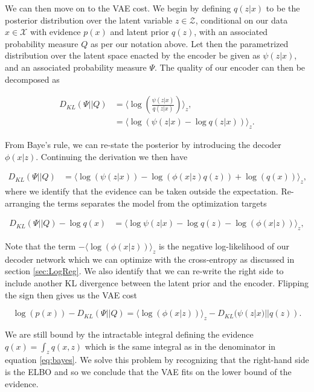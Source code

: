 We can then move on to the VAE cost. We begin by defining $q(z|x)$ to be the posterior distribution over the latent variable $z \in \mathcal{Z}$, conditional on our data $x \in \mathcal{X}$ with evidence $p(x)$ and latent prior $q(z)$, with an associated probability measure $Q$ as per our notation above. Let then the parametrized distribution over the latent space enacted by the encoder be given as $\psi(z|x)$, and an associated probability measure $\Psi$. The quality of our encoder can then be decomposed as 

\begin{align}
D_{KL}(\Psi || Q ) &= \langle \log \left(\frac{\psi(z|x)}{q(z|x)}\right) \rangle_z, \\
&= \langle \log \left(\psi(z|x)- \log q(z|x)\right) \rangle_z.
\end{align}

\noindent From Baye's rule, we can re-state the posterior by introducing the decoder $\phi(x|z)$. Continuing the derivation we then have 

\begin{align}
D_{KL}(\Psi || Q ) &=  \langle \log \left( \psi(z|x)\right)  - \log \left( \phi( x | z) q(z) \right) + \log (q(x))\rangle_z, 
\end{align}
\noindent where we identify that the evidence can be taken outside the expectation. Re-arranging the terms separates the model from the optimization targets 

\begin{align}
D_{KL}(\Psi || Q ) - \log q(x) &=  \langle \log \psi(z|x) - \log q(z) - \log \left( \phi( x | z)\right) \rangle_z, 
\end{align}

\noindent Note that the term $-\langle \log \left( \phi( x | z)\right) \rangle_z$ is the negative log-likelihood of our decoder network which we can optimize with the cross-entropy as discussed in section \ref{sec:LogReg}. We also identify that we can re-write the right side to include another KL divergence between the latent prior and the encoder. Flipping the sign then gives us the VAE cost

\begin{equation}\label{eq:vae_cost}
\log(p(x)) - D_{KL}(\Psi || Q )=  \langle \log \left( \phi( x | z)\right) \rangle_z - D_{KL}(\psi(z|x)|| q(z)).
\end{equation}
 
\noindent We are still bound by the intractable integral defining the evidence $q(x) = \int_z q(x, z)$ which is the same integral as in the denominator in equation \ref{eq:bayes}. We solve this problem by recognizing that the right-hand side is the ELBO and so we conclude that the VAE fits on the lower bound of the evidence.

